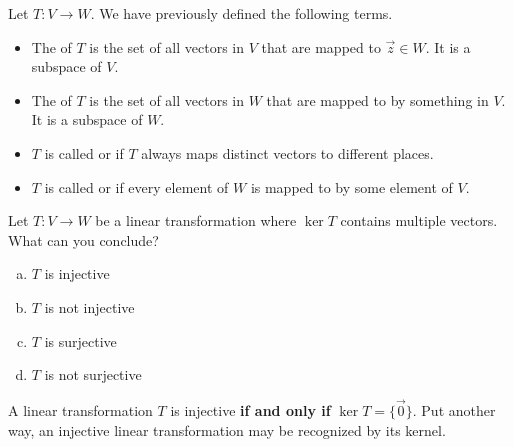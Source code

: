 \begin{observation}
Let \(T: V \rightarrow W\).  We have previously defined the following
terms.
\begin{itemize}
\item The  of \(T\) is the set of all vectors in \(V\) that are mapped to \(\vec{z}\in W\).  It is a subspace of \(V\).
\item The  of \(T\) is the set of all vectors in \(W\) that are mapped to by something in \(V\).  It is a subspace of \(W\).
\item  \(T\) is called  or  if \(T\) always maps  distinct vectors to different places.
\item \(T\) is called  or  if every element of \(W\) is mapped to by some element of \(V\).
\end{itemize}
\end{observation}

\begin{activity}{5}
Let \(T: V \rightarrow W\) be a linear transformation where
\(\ker T\) contains multiple vectors. What can you conclude?
\begin{enumerate}[(a)]
\item \(T\) is injective
\item \(T\) is not injective
\item \(T\) is surjective
\item \(T\) is not surjective
\end{enumerate}
\end{activity}

\begin{fact}
A linear transformation \(T\) is injective \textbf{if and only if} \(\ker T = \{\vec{0}\}\). Put another way, an injective linear transformation may be
recognized by its  kernel.

\begin{center}
\end{center}
\end{fact}

